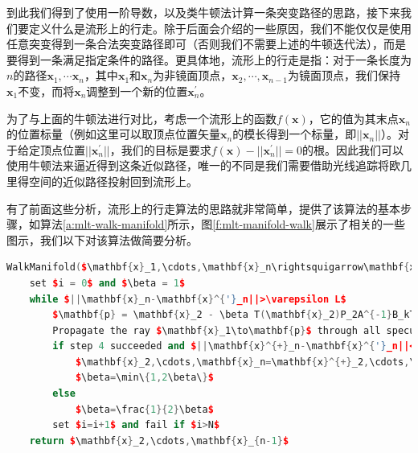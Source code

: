 到此我们得到了使用一阶导数，以及类牛顿法计算一条突变路径的思路，接下来我们要定义什么是流形上的行走。除于后面会介绍的一些原因，我们不能仅仅是使用任意突变得到一条合法突变路径即可（否则我们不需要上述的牛顿迭代法），而是要得到一条满足指定条件的路径。更具体地，流形上的行走是指：对于一条长度为$n$的路径$\mathbf{x}_1,\cdots\mathbf{x}_n$，其中$\mathbf{x}_1$和$\mathbf{x}_n$为非镜面顶点，$\mathbf{x}_2,\cdots,\mathbf{x}_{n-1}$为镜面顶点，我们保持$\mathbf{x}_1$不变，而将$\mathbf{x}_n$调整到一个新的位置$\mathbf{x}^{'}_n$。

\begin{myshaded}
	为了与上面的牛顿法进行对比，考虑一个流形上的函数$f({\mathbf{x}})$，它的值为其末点$\mathbf{x}_n$的位置标量（例如这里可以取顶点位置矢量$\mathbf{x}_n$的模长得到一个标量，即$||\mathbf{x}_n||$）。对于给定顶点位置$||\mathbf{x}^{'}_n||$，我们的目标是要求$f({\mathbf{x}})-||\mathbf{x}^{'}_n||=0$的根。因此我们可以使用牛顿法来逼近得到这条近似路径，唯一的不同是我们需要借助光线追踪将欧几里得空间的近似路径投射回到流形上。
\end{myshaded}

有了前面这些分析，流形上的行走算法的思路就非常简单，\cite{a:ManifoldExplorationExpanded,a:LIGHTTRANSPORTONPATHSPACEMANIFOLDS}提供了该算法的基本步骤，如算法\ref{a:mlt-walk-manifold}所示，图\ref{f:mlt-manifold-walk}展示了相关的一些图示，我们以下对该算法做简要分析。

\begin{algorithm}
\begin{lstlisting}[language=C++, mathescape]
WalkManifold($\mathbf{x}_1,\cdots,\mathbf{x}_n\rightsquigarrow\mathbf{x}^{'}_n$)
	set $i = 0$ and $\beta = 1$
	while $||\mathbf{x}_n-\mathbf{x}^{'}_n||>\varepsilon L$
		$\mathbf{p} = \mathbf{x}_2 - \beta T(\mathbf{x}_2)P_2A^{-1}B_kT(\mathbf{x}_n)^{T}(\mathbf{x}^{'}_n-\mathbf{x}_n)$
		Propagate the ray $\mathbf{x}_1\to\mathbf{p}$ through all specular interactions, producing $\mathbf{x}^{+}_2,\cdots,\mathbf{x}^{n}_n$.
		if step 4 succeeded and $||\mathbf{x}^{+}_n-\mathbf{x}^{'}_n||<||\mathbf{x}_n-\mathbf{x}^{'}_n||$
			$\mathbf{x}_2,\cdots,\mathbf{x}_n=\mathbf{x}^{+}_2,\cdots,\mathbf{x}^{+}_n$
			$\beta=\min\{1,2\beta\}$
		else
			$\beta=\frac{1}{2}\beta$
		set $i=i+1$ and fail if $i>N$
	return $\mathbf{x}_2,\cdots,\mathbf{x}_{n-1}$
\end{lstlisting}
\caption{每个顶点存储的数据，其中位置，法线以及位置和法线的导数都是通过获取顶点的时候从表面表述中获得，而该顶点关于镜面流形的各个矩阵则通过微分几何相关的知识计算而得，并且这些矩阵的计算仅依赖于上述的顶点几何数据}
\label{a:mlt-walk-manifold}
\end{algorithm}

